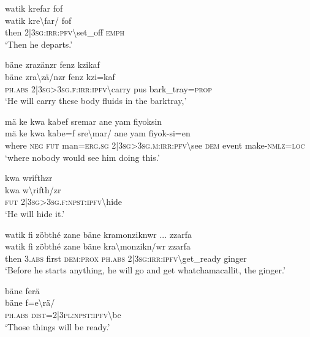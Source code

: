 \ea\label{ex:a4298}
watik krefar fof\\
\gll watik	kre{\textbackslash}far/	fof\\
     then	2|3\textsc{sg}:\textsc{irr}:\textsc{pfv}{\textbackslash}set\_off	\textsc{emph}\\
\glt `Then he departs.'
\z

\ea\label{ex:a4299}
bäne zrazänzr fenz kzikaf\\
\gll bäne	zra{\textbackslash}zä/nzr	fenz	kzi=kaf\\
     \textsc{ph}.\textsc{abs}	2|3\textsc{sg}>3\textsc{sg}.\textsc{f}:\textsc{irr}:\textsc{ipfv}{\textbackslash}carry	pus	bark\_tray=\textsc{prop}\\
\glt `He will carry these body fluids in the barktray,'
\z

\ea\label{ex:a4302}
mä ke kwa kabef sremar ane yam fiyoksin\\
\gll mä	ke	kwa	kabe=f	sre{\textbackslash}mar/	ane	yam	fiyok-si=en\\
     where	\textsc{neg}	\textsc{fut}	man=\textsc{erg}.\textsc{sg}	2|3\textsc{sg}>3\textsc{sg}.\textsc{m}:\textsc{irr}:\textsc{pfv}{\textbackslash}see	\textsc{dem}	event	make-\textsc{nmlz}=\textsc{loc}\\
\glt `where nobody would see him doing this.'
\z

\ea\label{ex:a4303}
kwa wrifthzr\\
\gll kwa	w{\textbackslash}rifth/zr\\
     \textsc{fut}	2|3\textsc{sg}>3\textsc{sg}.\textsc{f}:\textsc{npst}:\textsc{ipfv}{\textbackslash}hide\\
\glt `He will hide it.'
\z

\ea\label{ex:a4304}
watik fi zöbthé zane bäne kramonziknwr ... zzarfa\\
\gll watik	fi	zöbthé	zane	bäne	kra{\textbackslash}monzikn/wr	zzarfa\\
     then	3.\textsc{abs}	first	\textsc{dem}:\textsc{prox}	\textsc{ph}.\textsc{abs}	2|3\textsc{sg}:\textsc{irr}:\textsc{ipfv}{\textbackslash}get\_ready	ginger\\
\glt `Before he starts anything, he will go and get whatchamacallit, the ginger.'
\z

\ea\label{ex:a4306}
bäne ferä\\
\gll bäne	f=e{\textbackslash}rä/\\
     \textsc{ph}.\textsc{abs}	\textsc{dist}=2|3\textsc{pl}:\textsc{npst}:\textsc{ipfv}{\textbackslash}be\\
\glt `Those things will be ready.'
\z


